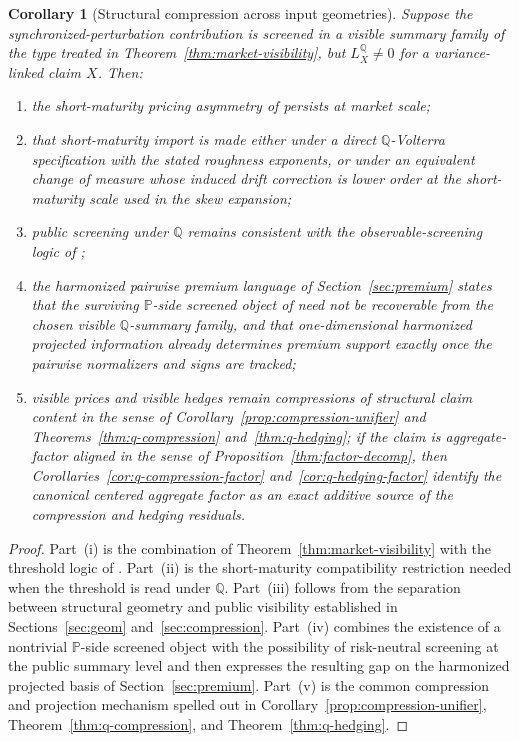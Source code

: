 \documentclass[11pt,a4paper]{amsart}
\theoremstyle{plain}
\newtheorem{corollary}[theorem]{Corollary}
\theoremstyle{definition}
\theoremstyle{remark}
\newcommand{\PP}{\mathbb{P}}
\newcommand{\QQ}{\mathbb{Q}}
\begin{document}
\begin{corollary}[Structural compression across input geometries]\label{cor:program-closure}
Suppose the synchronized-perturbation contribution is screened in a visible summary family of the
type treated in Theorem~\ref{thm:market-visibility}, but \(L_X^\QQ\neq0\) for a variance-linked
claim \(X\).  Then:
\begin{enumerate}[label=(\roman*)]
\item the short-maturity pricing asymmetry of \cite{vidal2026latent} persists at market scale;
\item that short-maturity import is made either under a direct \(\QQ\)-Volterra specification with
the stated roughness exponents, or under an equivalent change of measure whose induced drift
correction is lower order at the short-maturity scale used in the skew expansion;
\item public screening under \(\QQ\) remains consistent with the observable-screening logic of
\cite{vidal2026dynamic};
\item the harmonized pairwise premium language of Section~\ref{sec:premium} states that the
surviving \(\PP\)-side screened object of \cite{vidal2026econometric} need not be recoverable from
the chosen visible \(\QQ\)-summary family, and that one-dimensional harmonized projected
information already determines premium support exactly once the pairwise normalizers and signs are
tracked;
\item visible prices and visible hedges remain compressions of structural claim content in the
sense of Corollary~\ref{prop:compression-unifier} and
Theorems~\ref{thm:q-compression} and~\ref{thm:q-hedging}; if the claim is aggregate-factor
aligned in the sense of Proposition~\ref{thm:factor-decomp}, then
Corollaries~\ref{cor:q-compression-factor} and~\ref{cor:q-hedging-factor} identify the canonical
centered aggregate factor as an exact additive source of the compression and hedging residuals.
\end{enumerate}
\end{corollary}

\begin{proof}
Part~(i) is the combination of Theorem~\ref{thm:market-visibility} with the threshold logic of
\cite{vidal2026latent}.  Part~(ii) is the short-maturity compatibility restriction needed when
the threshold is read under \(\QQ\).  Part~(iii) follows from the separation between structural
geometry and public visibility established in Sections~\ref{sec:geom} and~\ref{sec:compression}.  Part~(iv)
combines the existence of a nontrivial \(\PP\)-side screened object with the possibility of
risk-neutral screening at the public summary level and then expresses the resulting gap on the
harmonized projected basis of Section~\ref{sec:premium}.  Part~(v) is the common compression and
projection mechanism spelled out in Corollary~\ref{prop:compression-unifier},
Theorem~\ref{thm:q-compression}, and Theorem~\ref{thm:q-hedging}.
\end{proof}
\end{document}
